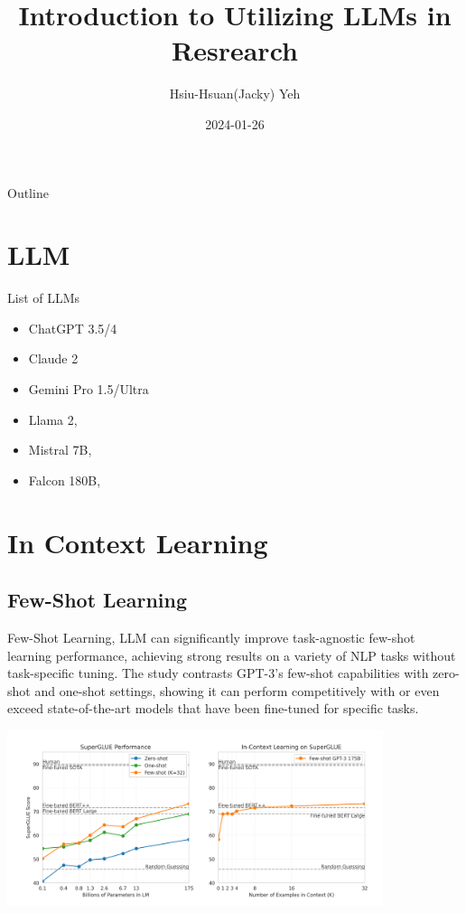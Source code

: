 \documentclass[11.5pt]{beamer}
\title{\huge{Introduction to Utilizing LLMs in Resrearch}}
\author{Hsiu-Hsuan(Jacky) Yeh}
\date{2024-01-26}
\begin{document}
\maketitle


\begin{frame}{Outline}
\tableofcontents
\end{frame}

\section{LLM}
\begin{frame}{List of LLMs}
\begin{itemize}
    \item ChatGPT 3.5/4
    \item Claude 2
    \item Gemini Pro 1.5/Ultra
    \item Llama 2, \cite{Touvron2023}
    \item Mistral 7B, \cite{Jiang2023} 
    \item Falcon 180B, \cite{Almazrouei2023}
\end{itemize}
\end{frame}

\section{In Context Learning}
\subsection{Few-Shot Learning}
\begin{frame}{Few-Shot Learning, \cite{Brown2020}}
LLM can significantly improve task-agnostic few-shot learning performance,
achieving strong results on a variety of NLP tasks without task-specific tuning.
The study contrasts GPT-3's few-shot capabilities with zero-shot and one-shot
settings, showing it can perform competitively with or even exceed
state-of-the-art models that have been fine-tuned for specific tasks.
\end{frame}


\begin{frame}
\includegraphics[width=11cm]{Figures/fig1.png}
\end{frame}
\end{document}
